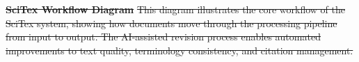 \documentclass[preprint,review,12pt]{elsarticle}%
\providecommand{\DIFdeltex}[1]{{\protect\color{red}\sout{#1}}}                      %
\providecommand{\DIFdelbegin}{} %
\providecommand{\DIFdelend}{} %
\providecommand{\DIFdelFL}[1]{\DIFdel{#1}} %
\providecommand{\DIFaddbeginFL}{} %
\providecommand{\DIFaddendFL}{} %
\providecommand{\DIFdelbeginFL}{} %
\providecommand{\DIFdelendFL}{} %
\providecommand{\DIFdel}[1]{\texorpdfstring{\DIFdeltex{#1}}{}} %
\newcommand{\DIFscaledelfig}{0.5}
\newlength{\DIFdelgraphicswidth} %
\newlength{\DIFdelgraphicsheight} %
\newcommand{\DIFaddincludegraphics}[2][]{{\color{blue}\fbox{\DIFOincludegraphics[#1]{#2}}}} %
\newcommand{\DIFdelincludegraphics}[2][]{%
\sbox{\DIFdelgraphicsbox}{\DIFOincludegraphics[#1]{#2}}%
\settoboxwidth{\DIFdelgraphicswidth}{\DIFdelgraphicsbox} %
\settoboxtotalheight{\DIFdelgraphicsheight}{\DIFdelgraphicsbox} %
\scalebox{\DIFscaledelfig}{%
\parbox[b]{\DIFdelgraphicswidth}{\usebox{\DIFdelgraphicsbox}\\[-\baselineskip] \rule{\DIFdelgraphicswidth}{0em}}\llap{\resizebox{\DIFdelgraphicswidth}{\DIFdelgraphicsheight}{%
\setlength{\unitlength}{\DIFdelgraphicswidth}%
\begin{picture}(1,1)%
\thicklines\linethickness{2pt} %
{\color[rgb]{1,0,0}\put(0,0){\framebox(1,1){}}}%
{\color[rgb]{1,0,0}\put(0,0){\line( 1,1){1}}}%
{\color[rgb]{1,0,0}\put(0,1){\line(1,-1){1}}}%
\end{picture}%
}\hspace*{3pt}}} %
} %
\DeclareRobustCommand{\DIFdelbegin}{\DIFOdelbegin \let\includegraphics\DIFdelincludegraphics} %
\DeclareRobustCommand{\DIFdelend}{\DIFOaddend \let\includegraphics\DIFOincludegraphics} %
\DeclareRobustCommand{\DIFaddbeginFL}{\DIFOaddbeginFL \let\includegraphics\DIFaddincludegraphics} %
\DeclareRobustCommand{\DIFaddendFL}{\DIFOaddendFL \let\includegraphics\DIFOincludegraphics} %
\DeclareRobustCommand{\DIFdelbeginFL}{\DIFOdelbeginFL \let\includegraphics\DIFdelincludegraphics} %
\DeclareRobustCommand{\DIFdelendFL}{\DIFOaddendFL \let\includegraphics\DIFOincludegraphics} %
\begin{document}
\begin{frontmatter}

{%
\textbf{\DIFdelFL{SciTex Workflow Diagram
}}
\DIFdelFL{This diagram illustrates the core workflow of the SciTex system, showing how documents move through the processing pipeline from input to output. The AI-assisted revision process enables automated improvements to text quality, terminology consistency, and citation management.
}}
\DIFdelendFL %

        	\DIFdelbeginFL %
\DIFdelend %
\clearpage
\DIFdelbegin %
\DIFdelendFL \DIFaddbeginFL \begin{figure*}[p]
    \DIFaddendFL \centering
\DIFdelbeginFL %


\end{figure*}
\end{frontmatter}
\end{document}
